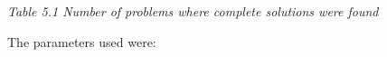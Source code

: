 \documentclass[pdftex,twoside,a4paper]{report}
\begin{document}

 \begin{center}
\emph{Table 5.1 Number of problems where complete solutions were found}
\end{center}
The parameters used were:



\end{document}
